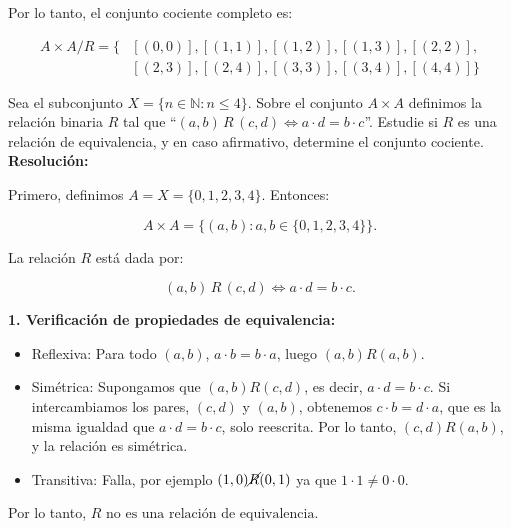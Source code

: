 \documentclass[a4paper,12pt]{article}
\begin{document}
\begin{ejercicio}[title=Ejercicio 11]
Por lo tanto, el conjunto cociente completo es:

\[
\boxed{
\begin{aligned}
A\times A / R = \{ &[(0,0)], [(1,1)], [(1,2)], [(1,3)], [(2,2)], \\
&[(2,3)], [(2,4)], [(3,3)], [(3,4)], [(4,4)] \}
\end{aligned}
}
\]

\end{ejercicio}

\begin{ejercicio}[title=Ejercicio 12]
Sea el subconjunto $X = \{n\in\mathbb{N} : n \le 4\}$. Sobre el conjunto $A\times A$ definimos la relación binaria
$R$ tal que ``$(a,b)\,R\,(c,d) \iff a\cdot d = b\cdot c$''. Estudie si $R$ es una relación de equivalencia, y en
caso afirmativo, determine el conjunto cociente.
\tcblower
\textbf{Resolución:}

Primero, definimos $A = X = \{0,1,2,3,4\}$. Entonces:

\[
A\times A = \{ (a,b) : a,b \in \{0,1,2,3,4\} \}.
\]

La relación $R$ está dada por:

\[
(a,b) \, R \, (c,d) \iff a\cdot d = b \cdot c.
\]

\textbf{1. Verificación de propiedades de equivalencia:}

\begin{itemize}
\item Reflexiva: Para todo $(a,b)$, $a\cdot b = b\cdot a$, luego $(a,b) R (a,b)$.  
\item Simétrica: Supongamos que $(a,b)R(c,d)$, es decir, $a\cdot d = b \cdot c$. Si intercambiamos los pares, $(c,d)$ y $(a,b)$, obtenemos $c\cdot b = d \cdot a$, que es la misma igualdad que $a\cdot d = b \cdot c$, solo reescrita. Por lo tanto, $(c,d) R (a,b)$, y la relación es simétrica.
\item Transitiva: Falla, por ejemplo $(1,0) \cancel{R} (0,1)$ ya que $1\cdot 1 \neq 0 \cdot 0$.  
\end{itemize}

Por lo tanto, \(\boxed{\text{$R$ no es una relación de equivalencia.}}\)

\end{ejercicio}
\end{document}
